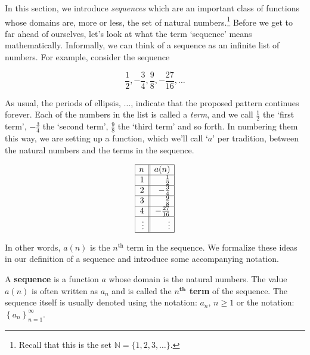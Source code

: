 \documentclass{ximera}
\begin{document}
	\author{Stitz-Zeager}




\setcounter{footnote}{0}

\label{Sequences}

In this section, we introduce \textit{sequences} which are an important class of functions whose domains are, more or less,  the set of natural numbers.\footnote{Recall that this is the set $\mathbb{N} = \{1, 2, 3, \ldots\}$.}  Before we get to far ahead of ourselves, let's look at what the term `sequence' means mathematically.  Informally, we can think of a sequence as an infinite list of numbers.  For example, consider the sequence

 \begin{equation} \label{seq1} \frac{1}{2}, -\frac{3}{4}, \frac{9}{8}, -\frac{27}{16}, \ldots \tag{1} \end{equation} 

As usual, the periods of  ellipsis, $\ldots$, indicate that the proposed pattern continues forever.  Each of the numbers in the list is called a  \textit{term}, and we call $\frac{1}{2}$ the `first term', $-\frac{3}{4}$  the `second term', $\frac{9}{8}$  the `third term' and so forth.  In numbering them this way, we are setting up a function, which we'll call `$a$' per tradition, between the natural numbers and the terms in the sequence.


\[ \begin{array}{|r||r|}  \hline
n & a(n)  \\   \hline
1  & \frac{1}{2} \\   \hline 
2 & -\frac{3}{4}  \\  \hline 
3 & \frac{9}{8}  \\  \hline 
4 & -\frac{27}{16}  \\  \hline 
\vdots & \vdots  \\  \hline
\end{array} \] 



In other words, $a(n)$ is the $n^{\text{th}}$ term in the sequence.  We formalize these ideas in our definition of a  sequence and introduce some accompanying notation.

 


\begin{definition} \label{sequencedefn}   A \textbf{sequence} is a function $a$ whose domain is the natural numbers. The value $a(n)$ is often written as $a_{n}$ and is called the   \textbf{\boldmath $n^{\textbf{th}}$ term} of the sequence.  The sequence itself is usually denoted using the notation:  $a_{n}$, $n \geq 1$ or the notation:  $\left\{ a_{n} \right\}_{n = 1}^{\infty}$.


\end{definition}
\end{document}
